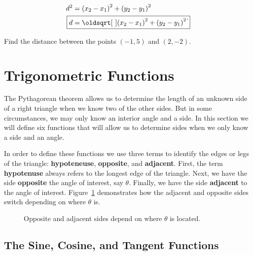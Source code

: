 \begin{align}
  d^{2} &= {(x_2-x_1)}^{2} + {(y_2-y_1)}^{2} \nonumber \\
  \Aboxed{d &= \sqrt{{(x_2-x_1)}^{2} + {(y_2-y_1)}^{2}}} \label{eq:distance-formula}
\end{align}

\begin{exercise}
  Find the distance between the points \((-1,5)\) and \((2,-2)\).

\end{exercise}


\newpage

\section{Trigonometric Functions}%
\label{sec:trigonometric-functions}

The Pythagorean theorem allows us to determine the length of an
unknown side of a right triangle when we know two of the other sides.
But in some circumstances, we may only know an interior angle and a
side. In this section we will define six functions that will allow us
to determine sides when we only know a side and an angle.

In order to define these functions we use three terms to identify the
edges or legs of the triangle: \textbf{hypoteneuse},
\textbf{opposite}, and \textbf{adjacent}. First, the term
\textbf{hypotenuse} always refers to the longest edge of the triangle.
Next, we have the side \textbf{opposite} the angle of interest, say
\(\theta\). Finally, we have the side \textbf{adjacent} to the angle
of interest. Figure~\ref{fig:opp-adj-hyp} demonstrates how the
adjacent and opposite sides switch depending on where \(\theta\) is.
\begin{figure}[h]
  \centering
  
  \caption{Opposite and adjacent sides depend on where \(\theta\) is
    located.}%
  \label{fig:opp-adj-hyp}
\end{figure}

\subsection{The Sine, Cosine, and Tangent Functions}%
\label{sub:sin-cos-tan}

